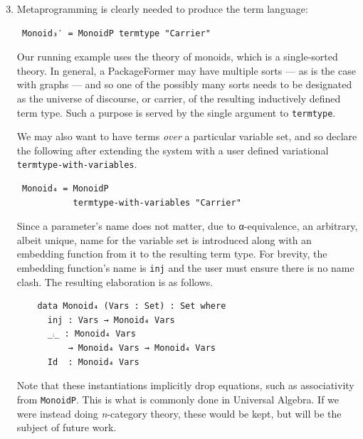 \documentclass[sigplan,screen]{acmart}
\begin{document}
\begin{enumerate}
\setcounter{enumi}{2}
\item Metaprogramming is clearly needed to produce the term language:
\vspace{0.3em}
\begin{verbatim}
 Monoid₃′ = MonoidP termtype "Carrier"
\end{verbatim}
\vspace{0.3em}
\noindent
Our running example uses the theory of monoids, which is a single-sorted theory.
In general, a \textsf{PackageFormer} may have multiple sorts --- as is the case with
graphs --- and so one of the possibly many sorts needs to be designated as the
universe of discourse, or carrier, of the resulting inductively defined term type.
Such a purpose is served by the single argument to \texttt{termtype}.

\vspace{0.3em}
\noindent
We may also want to have terms \emph{over} a particular variable set, and so declare
the following after extending the system with a user defined variational \texttt{termtype-with-variables}.

\vspace{0.3em}
\begin{verbatim}
 Monoid₄ = MonoidP
           termtype-with-variables "Carrier"
\end{verbatim}
\vspace{0.3em}
\noindent
Since a parameter's name does not matter, due to α-equivalence, an arbitrary,
albeit unique, name for the variable set is introduced along with an embedding
function from it to the resulting term type. For brevity, the embedding function's
name is \texttt{inj} and the user must ensure there is no name clash.
The resulting elaboration is as follows.
\vspace{0.3em}
\noindent
\begin{verbatim}
    data Monoid₄ (Vars : Set) : Set where
      inj : Vars → Monoid₄ Vars
      _⨾_ : Monoid₄ Vars
          → Monoid₄ Vars → Monoid₄ Vars
      Id  : Monoid₄ Vars
\end{verbatim}

\vspace{0.3em}
\noindent
Note that these instantiations implicitly drop equations, such
as associativity from \texttt{MonoidP}.  This is what is commonly done
in Universal Algebra. If we were instead doing \emph{n}-category
theory, these would be kept, but will be the subject of future
work.
\end{enumerate}
\end{document}
